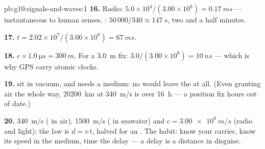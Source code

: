 \begin{solution}{pb:g10:signals-and-waves:1}
\textbf{16.} Radio: $5.0\times10^{4}/(3.00\times10^{8}) =
\qty{0.17}{ms}$ --- instantaneous to human senses. :
$50\,000/340 \approx \qty{147}{s}$, two and a half minutes.

\textbf{17.} $t = 2.02\times10^{7}/(3.00\times10^{8}) = \qty{67}{ms}$.

\textbf{18.} $c \times \qty{1.0}{\micro s} = \qty{300}{m}$. For a
\qty{3.0}{m} fix: $3.0/(3.00\times10^{8}) = \qty{10}{ns}$ --- which is
why GPS  carry atomic clocks.

\textbf{19.}  sit in vacuum, and  needs a medium: no
 would leave the  at all. (Even granting air the whole
way, \qty{20200}{km} at \qty{340}{m/s} is over \qty{16}{h} --- a
position fix hours out of date.)

\textbf{20.} \qty{340}{m/s} ( in air), \qty{1500}{m/s} ( in
seawater) and $c = \qty{3.00e8}{m/s}$ (radio and light); the law is
$d = v\,t$, halved for an . The habit: know your carrier, know its
speed in the medium, time the delay --- a delay is a distance in
disguise.
\end{solution}

